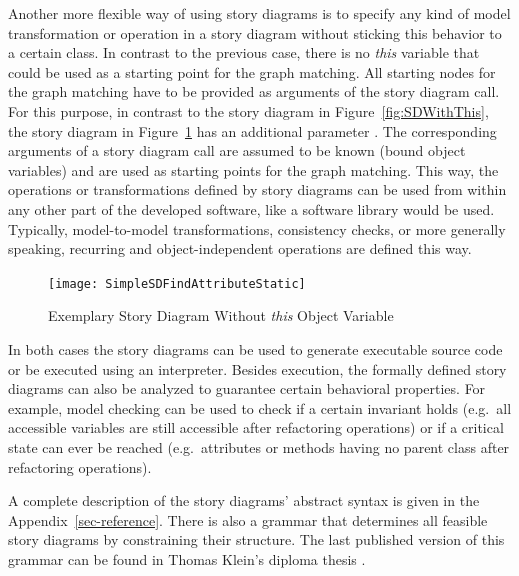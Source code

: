 Another more flexible way of using story diagrams is to specify any kind of model transformation or operation in a story diagram without sticking this behavior to a certain class.
In contrast to the previous case, there is no \emph{this} variable that could be used as a starting point for the graph matching.
All starting nodes for the graph matching have to be provided as arguments of the story diagram call.
For this purpose, in contrast to the story diagram in Figure~\ref{fig:SDWithThis}, the story diagram in Figure~\ref{fig:SDWithThisStatic} has an additional parameter .
The corresponding arguments of a story diagram call are assumed to be known (bound object variables) and are used as starting points for the graph matching.
This way, the operations or transformations defined by story diagrams can be used from within any other part of the developed software, like a software library would be used.
Typically, model-to-model transformations, consistency checks, or more generally speaking, recurring and object-independent operations are defined this way.

\begin{figure}[htb]
	\centering
  \texttt{[image: SimpleSDFindAttributeStatic]} 
  \caption{Exemplary Story Diagram Without \emph{this} Object Variable}
  \label{fig:SDWithThisStatic}
\end{figure}


In both cases the story diagrams can be used to generate executable source code or be executed using an interpreter.
Besides execution, the formally defined story diagrams can also be analyzed to guarantee certain behavioral properties.
For example, model checking can be used to check if a certain invariant holds
(e.g.\ all accessible variables are still accessible after refactoring operations)
or if a critical state can ever be reached (e.g.\ attributes or methods having no parent class after refactoring operations).

A complete description of the story diagrams' abstract syntax is given in the Appendix~\ref{sec-reference}.
There is also a grammar that determines all feasible story diagrams by constraining their structure.
The last published version of this grammar can be found in Thomas Klein's diploma thesis \cite{Kle99}.



